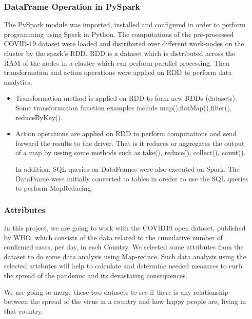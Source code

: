 \documentclass[12pt,letterpaper, twoside]{article}
\begin{document}
\subsubsection{DataFrame Operation in PySpark}

The PySpark module was imported, installed and configured in order to perform programming using Spark in Python. The computations of the pre-processed  COVID-19 dataset were loaded and  distributed over different work-nodes on the cluster by the spark's RDD. RDD is a dataset which is distributed across the RAM of the nodes in a cluster  which can perform parallel processing. Then transformation and action operations were applied on RDD to perform data analytics. 
\begin{itemize}
    \item Transformation method is applied on RDD to form new RDDs (datasets). Some transformation function examples include map(),flatMap(),filter(), reduceByKey(). 
    \item Action operations are applied on RDD to perform computations and send forward the results to the driver. That is it reduces or aggregates the output of a map by ussing some methods such as take(), reduce(), collect(), count().
    
In addition, SQL queries on DataFrames were also executed on Spark. The DataFrame were initially converted to tables in oreder to use the SQL queries to perform MapReducing. 

\end{itemize}

\subsubsection{Attributes}
 In this project, we are going to work with the COVID19 open dataset, published by WHO, which consists of the data related to the cumulative number of confirmed cases, per day, in each Country. We selected some attributes from the dataset  to do some data analysis using Map-reduce.  Such data analysis using the selected attrbutes will help to calculate and determine needed measures to curb the spread of the pandemic and its devastating consequences.
 
 We are going to merge these two datasets to see if there is any relationship between the spread of the virus in a country and how happy people are, living in that country.
\end{document}
